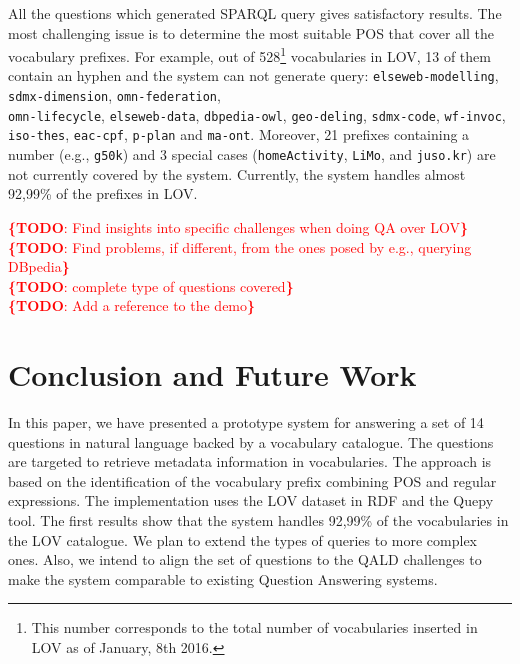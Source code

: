 \documentclass[runningheads,a4paper]{llncs}
\newcommand{\todo}[1]{\noindent\textcolor{red}{{\bf \{TODO}: #1{\bf \}}}}
\begin{document}
All the questions which generated SPARQL query gives satisfactory results. The most challenging issue is to determine the most suitable POS that cover all the vocabulary prefixes. For example, out of 528\footnote{This number corresponds to the total number of vocabularies inserted in LOV as of January, 8th 2016.} vocabularies in LOV, 13 of them contain an hyphen and the system can not generate query: \texttt{elseweb-modelling}, \texttt{sdmx-dimension}, \texttt{omn-federation}, \\ \texttt{omn-lifecycle}, \texttt{elseweb-data}, \texttt{dbpedia-owl}, \texttt{geo-deling}, \texttt{sdmx-code}, \texttt{wf-invoc}, \texttt{iso-thes}, \texttt{eac-cpf}, \texttt{p-plan} and \texttt{ma-ont}. Moreover, 21 prefixes containing a number (e.g., \texttt{g50k}) and 3 special cases (\texttt{homeActivity}, \texttt{LiMo}, and \texttt{juso.kr}) are not currently covered by the system. Currently, the system handles almost 92,99\% of the prefixes in LOV.

\todo{Find insights into specific challenges when doing QA over LOV}\\
\todo{Find problems, if different, from the ones posed by e.g., querying DBpedia}\\
\todo{complete type of questions covered}\\
\todo{Add a reference to the demo}





\section{Conclusion and Future Work}
\label{sec:conclusion}
%

In this paper, we have presented a prototype system for answering a set of 14 questions in natural language backed by a vocabulary catalogue. The questions are targeted to retrieve metadata information in vocabularies. The approach is based on the identification of the vocabulary prefix combining POS and regular expressions. The implementation uses the LOV dataset in RDF and the Quepy tool. The first results show that the system handles 92,99\% of the vocabularies in the LOV catalogue. 
We plan to extend the types of queries to more complex ones. Also, we intend to align the set of questions to the QALD challenges to make the system comparable to existing Question Answering systems.  
\end{document}
